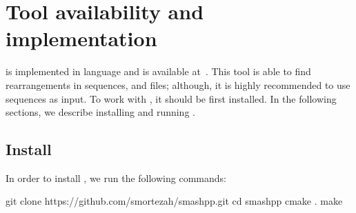 \clearpage
\section{Tool availability and implementation}
\label{sec:tool}
\smashpp is implemented in \cpp language and is available at~\cite{web-smashpp}. This tool is able to find rearrangements in sequences, \fasta and \fastq files; although, it is highly recommended to use sequences as input. To work with \smashpp, it should be first installed. 
In the following sections, we describe installing and running \smashpp.


\subsection{Install}
In order to install \smashpp, we run the following commands:
\begin{code}[style=bash]
git clone https://github.com/smortezah/smashpp.git
cd smashpp
cmake .
make
\end{code}


